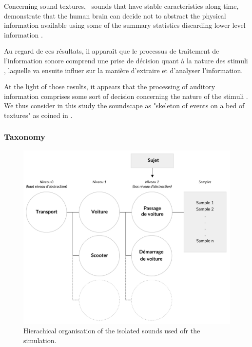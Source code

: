 \documentclass[twoside,twocolumn]{article}
\begin{document}

Concerning sound textures, \ie~sounds that have stable caracteristics along time, \cite{mcdermott2011sound,mcdermott2013summary} demonstrate that the human brain can decide not to abstract the physical information available using some of the summary statistics discarding lower level information \cite{nelken2013ear}.

Au regard de ces résultats, il apparaît que le processus de traitement de l'information sonore comprend une prise de décision quant à la nature des stimuli \cite{nelken2013ear,mcdermott2013summary}, laquelle va ensuite influer sur la manière d'extraire et d'analyser l'information.

At the light of those results, it appears that the processing of auditory information comprises some sort of decision concerning the nature of the stimuli \cite{nelken2013ear,mcdermott2013summary}. We thus consider in this study the soundscape as "skeleton of events on a bed of textures" as coined in \cite{nelken2013ear}.

\subsubsection*{Taxonomy}

\begin{figure}[t]
        \myfloatalign
        \includegraphics[width=.8\linewidth]{gfx/ch_4/3}
       \caption{Hierachical organisation of the isolated sounds used ofr the simulation.}\label{fig:orgDb}
\end{figure}
\end{document}
